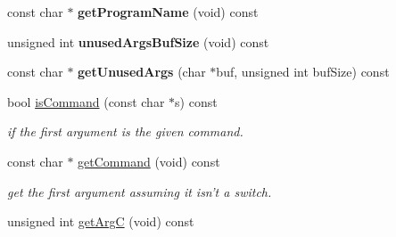 \begin{DoxyCompactItemize}
\item 
\hypertarget{classSampleFramework_1_1SampleCommandLine_a0458a17045818d4c943e8216f42c6950}{
const char $\ast$ {\bfseries getProgramName} (void) const }
\label{classSampleFramework_1_1SampleCommandLine_a0458a17045818d4c943e8216f42c6950}

\item 
\hypertarget{classSampleFramework_1_1SampleCommandLine_a41e49814603360930bb5b8f58bc5621d}{
unsigned int {\bfseries unusedArgsBufSize} (void) const }
\label{classSampleFramework_1_1SampleCommandLine_a41e49814603360930bb5b8f58bc5621d}

\item 
\hypertarget{classSampleFramework_1_1SampleCommandLine_a9af081da99b3408f54be61ed95521e8c}{
const char $\ast$ {\bfseries getUnusedArgs} (char $\ast$buf, unsigned int bufSize) const }
\label{classSampleFramework_1_1SampleCommandLine_a9af081da99b3408f54be61ed95521e8c}

\item 
\hypertarget{classSampleFramework_1_1SampleCommandLine_a3c4cb1c7c66376b8bf26348aab089744}{
bool \hyperlink{classSampleFramework_1_1SampleCommandLine_a3c4cb1c7c66376b8bf26348aab089744}{isCommand} (const char $\ast$s) const }
\label{classSampleFramework_1_1SampleCommandLine_a3c4cb1c7c66376b8bf26348aab089744}

\begin{DoxyCompactList}\small\item\em if the first argument is the given command. \item\end{DoxyCompactList}\item 
\hypertarget{classSampleFramework_1_1SampleCommandLine_ab6709c21e6a5cd98c5b623a785d431fa}{
const char $\ast$ \hyperlink{classSampleFramework_1_1SampleCommandLine_ab6709c21e6a5cd98c5b623a785d431fa}{getCommand} (void) const }
\label{classSampleFramework_1_1SampleCommandLine_ab6709c21e6a5cd98c5b623a785d431fa}

\begin{DoxyCompactList}\small\item\em get the first argument assuming it isn't a switch. \item\end{DoxyCompactList}\item 
\hypertarget{classSampleFramework_1_1SampleCommandLine_ade51b9540aa552635767d92457cddc00}{
unsigned int \hyperlink{classSampleFramework_1_1SampleCommandLine_ade51b9540aa552635767d92457cddc00}{getArgC} (void) const }
\label{classSampleFramework_1_1SampleCommandLine_ade51b9540aa552635767d92457cddc00}


\end{DoxyCompactItemize}

